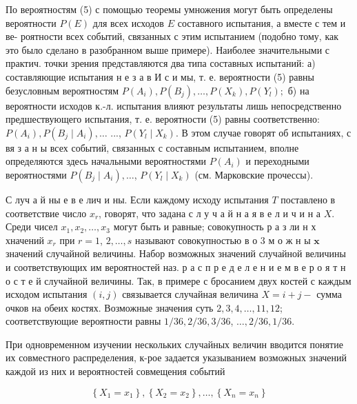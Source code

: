 \documentclass[10pt]{article}
\begin{document}
По вероятностям (5) с помощью теоремы умножения могут быть определены вероятности $P(E)$ для всех исходов $E$ составного испытания, а вместе с тем и ве- роятности всех событий, связанных с этим испытанием (подобно тому, как это было сделано в разобранном выше примере). Наиболее значительными с практич. точки зрения представляются два типа составных испытаний: а) составляющие испытания н е з а в И с и мы, т. е. вероятности (5) равны безусловным вероятностям $P\left(A_{i}\right), P\left(B_{j}\right), \ldots, P\left(X_{k}\right), P\left(Y_{l}\right) ;$ б) на вероятности исходов к.-л. испытания влияют результаты лишь непосредственно предшествующего испытания, т. е. вероятности (5) равны соответственно: $P\left(A_{i}\right), P\left(B_{j} \mid A_{i}\right), \ldots$ ..., $P\left(Y_{l} \mid X_{k}\right)$. В этом случае говорят об испытаниях, с вя з а н ы всех событий, связанных с составным испытанием, вполне определяются здесь начальными вероятностями $P\left(A_{i}\right)$ и переходными вероятностями $P\left(B_{j} \mid A_{i}\right), \ldots$, $P\left(Y_{l} \mid X_{k}\right)$ (см. Марковские прочессы).



С луч а й ны е в е лич и ны. Если каждому исходу испытания $T$ поставлено в соответствие число $x_{r}$, говорят, что задана с л у ч а й н а я в е л и ч и н а $X$. Среди чисел $x_{1}, x_{2}, \ldots, x_{3}$ могут быть и равные; совокупность р а з ли н х хначений $x_{r}$ при $r=1$, $2, \ldots, s$ называют совокупностью в о 3 м о ж н ы $\mathbf{x}$ значений случайной величины. Набор возможных значений случайной величины и соответствующих им вероятностей наз. р а с п р е д е л е н и е м в е р о я т н о с т е й случайной величины. Так, в примере с бросанием двух костей с каждым исходом испытания $(i, j)$ связывается случайная величина $X=i+j-$ сумма очков на обеих костях. Возможные значения суть $2,3,4, \ldots, 11,12$; соответствующие вероятности равны $1 / 36,2 / 36,3 / 36$, $\ldots, 2 / 36,1 / 36$.



При одновременном изучении нескольких случайных величин вводится понятие их совместного распределения, к-рое задается указыванием возможных значений каждой из них и вероятностей совмещения событий



\[

\left\{X_{1}=x_{1}\right\},\left\{X_{2}=x_{2}\right\}, \ldots,\left\{X_{n}=x_{n}\right\}

\]
\end{document}
